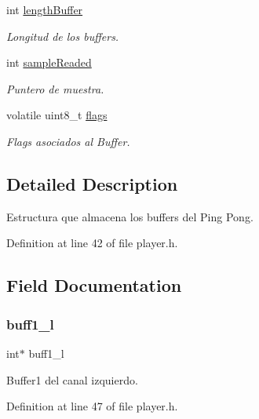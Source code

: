 \begin{DoxyCompactItemize}
int \mbox{\hyperlink{struct_b_u_f_f_e_r_s_ac2e1f44fd987b80899a7c4a2532af5ef}{length\+Buffer}}
\begin{DoxyCompactList}\small\item\em Longitud de los buffers. \end{DoxyCompactList}\item 
int \mbox{\hyperlink{struct_b_u_f_f_e_r_s_ac6bbdc3545a0dbf8a4f7e405ce2adf3d}{sample\+Readed}}
\begin{DoxyCompactList}\small\item\em Puntero de muestra. \end{DoxyCompactList}\item 
volatile uint8\+\_\+t \mbox{\hyperlink{struct_b_u_f_f_e_r_s_a27ac1730f3c9b0d5935ac0c406f7b9f3}{flags}}
\begin{DoxyCompactList}\small\item\em Flags asociados al Buffer. \end{DoxyCompactList}\end{DoxyCompactItemize}


\subsection{Detailed Description}
Estructura que almacena los buffers del Ping Pong. 

Definition at line 42 of file player.\+h.



\subsection{Field Documentation}
\mbox{\label{struct_b_u_f_f_e_r_s_a39eefabe09b3b120d69fbaa4b6b005ce}} 
\subsubsection{\texorpdfstring{buff1\+\_\+l}{buff1\_l}}
{\footnotesize\ttfamily int$\ast$ buff1\+\_\+l}



Buffer1 del canal izquierdo. 



Definition at line 47 of file player.\+h.

\mbox{\label{struct_b_u_f_f_e_r_s_ad31aa70b56496218b2a23ff3515a1cd6}} 
